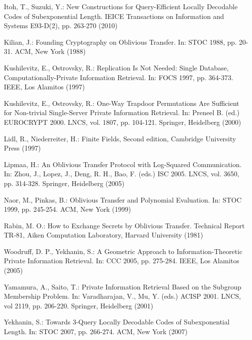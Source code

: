\documentclass[JMC]{degruyter-journal}
\begin{document}
\begin{thebibliography}{00}
Itoh, T., Suzuki, Y.: New Constructions for Query-Efficient Locally
Decodable Codes of Subexponential Length. IEICE Transactions on
Information and Systems E93-D(2), pp.  263-270 (2010)


Kilian, J.: Founding Cryptography on Oblivious Transfer. In:  STOC
1988, pp. 20-31. ACM, New York (1988)

Kushilevitz, E., Ostrovsky, R.: Replication Is Not Needed: Single
Database, Computationally-Private Information Retrieval. In: FOCS
1997, pp. 364-373. IEEE, Los Alamitos (1997)

Kushilevitz, E., Ostrovsky, R.: One-Way Trapdoor Permutations Are
Sufficient for Non-trivial Single-Server Private Information
Retrieval. In: Preneel B. (ed.)  EUROCRYPT 2000. LNCS, vol. 1807,
pp. 104-121. Springer, Heidelberg  (2000)

Lidl, R., Niederreiter, H.: Finite Fields, Second edition, Cambridge
University Press (1997)


Lipmaa, H.: An Oblivious Transfer Protocol with Log-Squared
Communication. In: Zhou, J.,  Lopez, J.,  Deng, R. H., Bao, F.
(eds.) ISC 2005. LNCS, vol. 3650, pp. 314-328. Springer, Heidelberg
(2005)


Naor, M., Pinkas, B.: Oblivious Transfer and Polynomial Evaluation.
In: STOC 1999, pp. 245-254. ACM, New York (1999)





Rabin, M. O.: How to Exchange Secrets by Oblivious Transfer.
Technical Report TR-81, Aiken Computation Laboratory, Harvard
University (1981)

Woodruff, D. P., Yekhanin, S.: A Geometric Approach to
Information-Theoretic Private Information Retrieval. In: CCC 2005,
pp. 275-284. IEEE, Los Alamitos  (2005)






Yamamura, A., Saito, T.: Private Information Retrieval Based on the
Subgroup Membership Problem. In: Varadharajan, V., Mu, Y. (eds.)
ACISP 2001. LNCS, vol 2119,  pp. 206-220.  Springer, Heidelberg
(2001)





Yekhanin, S.: Towards 3-Query Locally Decodable Codes of
Subexponential Length. In: STOC 2007, pp. 266-274. ACM, New York
(2007)


\end{thebibliography}
\end{document}
